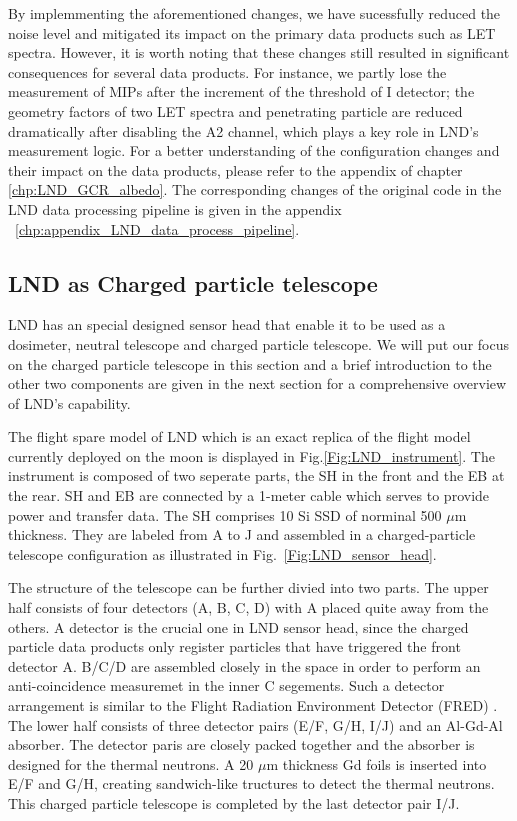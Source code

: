 By implemmenting the aforementioned changes, we have sucessfully reduced the noise level and mitigated its impact on the primary data products such as \ac{LET} spectra. However, it is worth noting that these changes still resulted in significant consequences for several data products. For instance, we partly lose the measurement of \acp{MIP} after the increment of the threshold of I detector; the geometry factors of two \ac{LET} spectra and penetrating particle are reduced dramatically after disabling the A2 channel, which plays a key role in \ac{LND}'s measurement logic. For a better understanding of the configuration changes and their impact on the data products, please refer to the appendix of chapter \ref{chp:LND_GCR_albedo}.
The corresponding changes of the original code in the LND data processing pipeline is given in the appendix ~\ref{chp:appendix_LND_data_process_pipeline}.



\subsection{LND as Charged particle telescope}

\ac{LND} has an special designed sensor head that enable it to be used as a dosimeter, neutral telescope and charged particle telescope. We will put our focus on the charged particle telescope in this section and a brief introduction to the other two components are given in the next section for a comprehensive overview of LND's capability.

The flight spare model of \ac{LND} which is an exact replica of the flight model currently deployed on the moon is displayed in Fig.\ref{Fig:LND_instrument}. The instrument is composed of two seperate parts, the \ac{SH} in the front and the \ac{EB} at the rear. \ac{SH} and \ac{EB} are connected by a 1-meter cable which serves to provide power and transfer data. 
The \ac{SH} comprises 10 Si \acs{SSD} of norminal 500 $\mu$m thickness. They are labeled from A to J and assembled in a charged-particle telescope configuration as illustrated in Fig.~\ref{Fig:LND_sensor_head}.

The structure of the telescope can be further divied into two parts. The upper half consists of four detectors (A, B, C, D) with A placed quite away from the others. A detector is the crucial one in \ac{LND} sensor head, since the charged particle data products only register particles that have triggered the front detector A. B/C/D are assembled closely in the space in order to perform an anti-coincidence measuremet in the inner C segements. Such a detector arrangement is similar to the Flight Radiation Environment Detector (FRED) \citep{moeller-etal-2013, moeller-etal-2013b}. The lower half consists of three detector pairs (E/F, G/H, I/J) and an Al-Gd-Al absorber. The detector paris are closely packed together and the absorber is designed for the thermal neutrons. A 20 $\mu$m thickness Gd foils is inserted into E/F and G/H, creating sandwich-like tructures to detect the thermal neutrons. This charged particle telescope is completed by the last detector pair I/J.

